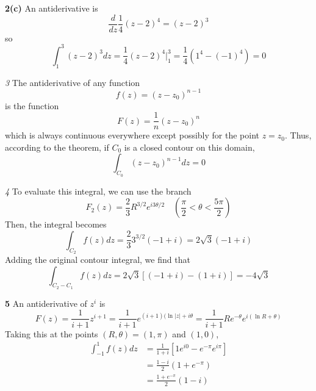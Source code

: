 \documentclass{article}
\begin{document}
\textbf{2(c)}
An antiderivative is
\[
	\frac{d}{dz} \frac{1}{4} (z - 2)^4 = (z - 2)^3
\]
so
\[
	\int_1^3 (z - 2)^3 dz 
	= \frac{1}{4} (z - 2)^4 \Big|_1^3
	= \frac{1}{4} (1^4 - (-1)^4)
	= 0
\]

\textit{3}
The antiderivative of any function
\[
	f(z) = (z - z_0)^{n-1}
\]
is the function
\[
	F(z) = \frac{1}{n} (z - z_0)^{n}
\]
which is always continuous everywhere except possibly for the point $z = z_0$. Thus, according to the theorem, if $C_0$ is a closed contour on this domain,
\[
	\int_{C_0} (z - z_0)^{n-1} dz = 0
\]

\textit{4} 
To evaluate this integral, we can use the branch
\[
	F_2(z) = \frac{2}{3} R^{3/2} e^{i3\theta/2} \quad
	\left( \frac{\pi}{2} < \theta < \frac{5\pi}{2} \right)
\]
Then, the integral becomes
\[
	\int_{C_2} f(z) dz
	= \frac{2}{3} 3^{3/2} (-1 + i)
	= 2\sqrt{3} (-1 + i)
\]
Adding the original contour integral, we find that
\[
	\int_{C_2 - C_1} f(z) dz
	= 2\sqrt{3} [(-1 + i) - (1 + i)]
	= -4\sqrt{3} 
\]

\textbf{5}
An antiderivative of $z^i$ is
\[
	F(z) = \frac{1}{i+1} z^{i+1} 
	= \frac{1}{i+1} e^{(i+1)(\ln |z| + i\theta}
	= \frac{1}{i+1} Re^{-\theta} e^{i (\ln R + \theta)} 
\]
Taking this at the points $(R, \theta) = (1, \pi)$ and $(1, 0)$,
\begin{align*}
	\int_{-1}^{1} f(z) dz
	&= \frac{1}{1+i} \left[ 1e^{i0} - e^{-\pi}e^{i\pi} \right] \\
	&= \frac{1-i}{2} (1 + e^{-\pi}) \\
	&= \frac{1 + e^{-\pi}}{2} (1 - i)
\end{align*}
\end{document}
